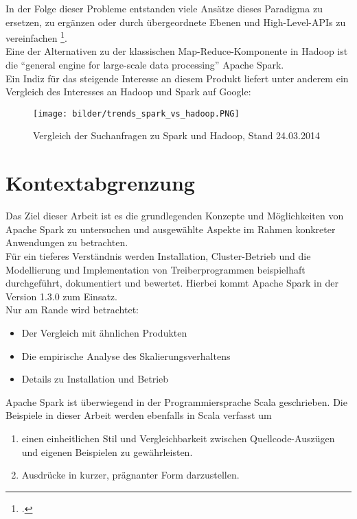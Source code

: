 In der Folge dieser Probleme entstanden viele Ansätze dieses Paradigma zu ersetzen, zu ergänzen oder durch übergeordnete Ebenen und High-Level-APIs zu vereinfachen \footcite{Sin14}.\\

Eine der Alternativen zu der klassischen Map-Reduce-Komponente in Hadoop ist die "`general engine for large-scale data processing"' Apache Spark.\\

Ein Indiz für das steigende Interesse an diesem Produkt liefert unter anderem ein Vergleich des Interesses an Hadoop und Spark auf Google:\\

\begin{figure}[h]
\texttt{[image: bilder/trends\_spark\_vs\_hadoop.PNG]}
\caption[Google Trends]{Vergleich der Suchanfragen zu Spark und Hadoop, Stand 24.03.2014 \cite{googletrends}}
\end{figure}

\section{Kontextabgrenzung}
Das Ziel dieser Arbeit ist es die grundlegenden Konzepte und Möglichkeiten von Apache Spark zu untersuchen und ausgewählte Aspekte im Rahmen konkreter Anwendungen zu betrachten.\\

Für ein tieferes Verständnis werden Installation, Cluster-Betrieb und die Modellierung und Implementation von Treiberprogrammen beispielhaft durchgeführt, dokumentiert und bewertet. Hierbei kommt Apache Spark in der Version 1.3.0 zum Einsatz.\\

Nur am Rande wird betrachtet:
\begin{itemize}
	\item Der Vergleich mit ähnlichen Produkten
	\item Die empirische Analyse des Skalierungsverhaltens
	\item Details zu Installation und Betrieb
\end{itemize}

Apache Spark ist überwiegend in der Programmiersprache Scala geschrieben. Die Beispiele in dieser Arbeit werden ebenfalls in Scala verfasst um
\begin{enumerate}
	\item einen einheitlichen Stil und Vergleichbarkeit zwischen Quellcode-Auszügen und eigenen Beispielen zu gewährleisten.
	\item Ausdrücke in kurzer, prägnanter Form darzustellen.
\end{enumerate}
